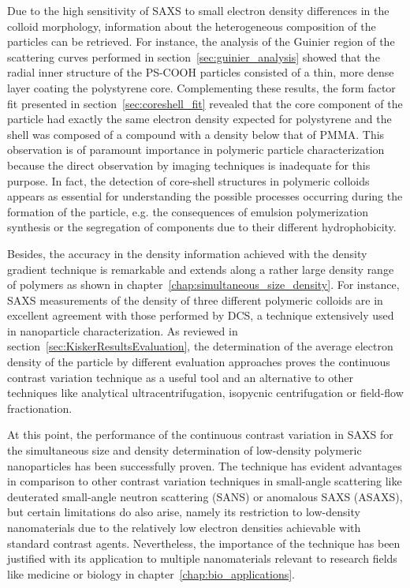 Due to the high sensitivity of SAXS to small electron density differences in the colloid morphology, information about the heterogeneous composition of the particles can be retrieved. For instance, the analysis of the Guinier region of the scattering curves performed in section~\ref{sec:guinier_analysis} showed that the radial inner structure of the PS-COOH particles consisted of a thin, more dense layer coating the polystyrene core. Complementing these results, the form factor fit presented in section~\ref{sec:coreshell_fit} revealed that the core component of the particle had exactly the same electron  density expected for polystyrene and the shell was composed of a compound with a density below that of PMMA. This observation is of paramount importance in polymeric particle characterization because the direct observation by imaging techniques is inadequate for this purpose. In fact, the detection of core-shell structures in polymeric colloids appears as essential for understanding the possible processes occurring during the formation of the particle, e.g. the consequences of emulsion polymerization synthesis or the segregation of components due to their different hydrophobicity.

Besides, the accuracy in the density information achieved with the density gradient technique is remarkable and extends along a rather large density range of polymers as shown in chapter~\ref{chap:simultaneous_size_density}. For instance, SAXS measurements of the density of three different polymeric colloids are in excellent agreement with those performed by DCS, a technique extensively used in nanoparticle characterization. As reviewed in section~\ref{sec:KiskerResultsEvaluation}, the determination of the average electron density of the particle by different evaluation approaches proves the continuous contrast variation technique as a useful tool and an alternative to other techniques like analytical ultracentrifugation, isopycnic centrifugation or field-flow fractionation.

At this point, the performance of the continuous contrast variation in SAXS for the simultaneous size and density determination of low-density polymeric nanoparticles has been successfully proven. The technique has evident advantages in comparison to other contrast variation techniques in small-angle scattering like deuterated small-angle neutron scattering (SANS) or anomalous SAXS (ASAXS), but certain limitations do also arise, namely its restriction to low-density nanomaterials due to the relatively low electron densities achievable with standard contrast agents. Nevertheless, the importance of the technique has been justified with its application to multiple nanomaterials relevant to research fields like medicine or biology in chapter~\ref{chap:bio_applications}.


